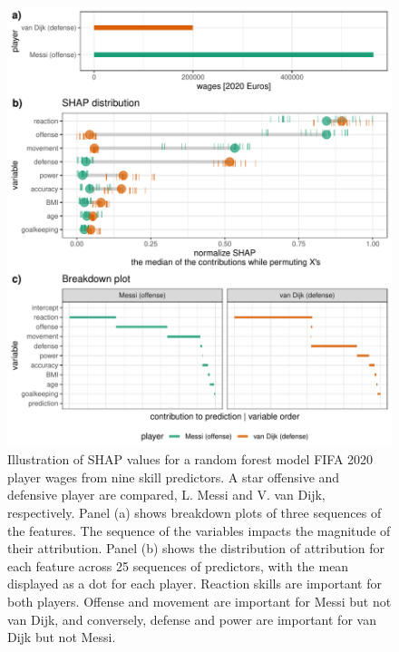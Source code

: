\documentclass[
]{article}
\begin{document}
\begin{figure}

{\centering \includegraphics[width=1\linewidth]{./figures/shap_distr_bd} 

}

\caption{Illustration of SHAP values for a random forest model FIFA 2020 player wages from nine skill predictors. A star offensive and defensive player are compared, L. Messi and V. van Dijk, respectively. Panel (a) shows breakdown plots of three sequences of the features. The sequence of the variables impacts the magnitude of their attribution. Panel (b) shows the distribution of attribution for each feature across 25 sequences of predictors, with the mean displayed as a dot for each player. Reaction skills are important for both players. Offense and movement are important for Messi but not van Dijk, and conversely, defense and power are important for van Dijk but not Messi.}\label{fig:shapdistrbd}
\end{figure}
\end{document}
